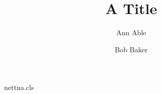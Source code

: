 \begin{filecontents*}[overwrite]{nettna.cls}
\newcount\titlenotecount \newtoks\tntoks \newtoks\tntokstwo
\def\titlenote#1{\global\advance\titlenotecount by 1
  \ifnum\titlenotecount=1 \raisebox{9pt}{$\ast$}\global\tntoks={#1}\fi
  \ifnum\titlenotecount=2 \raisebox{9pt}{$\dagger$}\global\tntokstwo={#1}\fi}
\renewenvironment{abstract}{\ifnum\titlenotecount>0 \insert\footins{\footnotesize
  \raisebox{4pt}{$\ast$}\the\tntoks\par
  \ifnum\titlenotecount>1 \raisebox{4pt}{$\dagger$}\the\tntokstwo\par\fi}\fi
  \section*{Abstract}}{\par}
\end{filecontents*}
\documentclass{nettna}
\title{A Title}
\author{Ann Able \and Bob Baker}

\maketitle
\begin{abstract}
An abstract.
\end{abstract}
Text.

